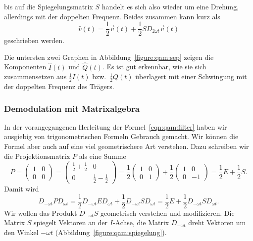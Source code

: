 bis auf die Spiegelungsmatrix $S$ handelt es sich also wieder um eine
Drehung, allerdings mit der doppelten Frequenz.
Beides zusammen kann kurz als
\begin{equation}
\hat{v}(t)
=
\frac12 \vec{v}(t)
+
\frac12 SD_{2\omega t}\vec{v}(t)
\label{eqn:qam:filter}
\end{equation}
geschrieben werden.

Die untersten zwei Graphen in Abbildung~\ref{figure:qam:sep} zeigen
die Komponenten $\hat{I}(t)$ und $\hat{Q}(t)$.
Es ist gut erkennbar, wie sie sich zusammensetzen aus $\frac12I(t)$ 
bzw.~$\frac12Q(t)$ überlagert mit einer Schwingung mit der doppelten
Frequenz des Trägers.

\subsubsection{Demodulation mit Matrixalgebra}
In der vorangegangenen Herleitung der Formel~\eqref{eqn:qam:filter}
haben wir ausgiebig von trigonometrischen Formeln Gebrauch gemacht.
Wir können die Formel aber auch auf eine viel geometrischere Art verstehen.
Dazu schreiben wir die Projektionsmatrix $P$ als eine Summe
\[
P
=
\begin{pmatrix}1&0\\0&0\end{pmatrix}
=
\begin{pmatrix}\frac12+\frac12&0\\0&\frac12-\frac12\end{pmatrix}
=
\frac12\begin{pmatrix}1&0\\0&1\end{pmatrix}
+
\frac12\begin{pmatrix}1&0\\0&-1\end{pmatrix}
=
\frac12E+\frac12S.
\]
Damit wird
\[
D_{-\omega t}PD_{\omega t}
=
\frac12D_{-\omega t}ED_{\omega t}
+
\frac12D_{-\omega t}SD_{\omega t}
=
\frac12E
+
\frac12D_{-\omega t}SD_{\omega t}.
\]
Wir wollen das Produkt $D_{-\omega t}S$ geometrisch verstehen und
modifizieren.
Die Matrix $S$ spiegelt Vektoren an der $I$-Achse, die Matrix $D_{-\omega t}$
dreht Vektoren um den Winkel $-\omega t$
(Abbildung~\ref{figure:qam:spiegelung}).
